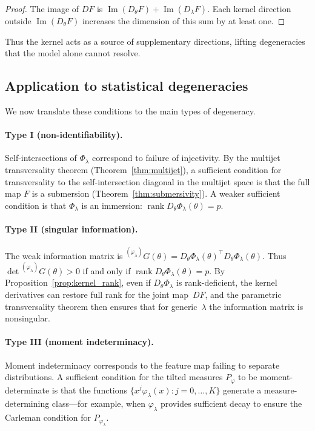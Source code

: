 \documentclass[11pt,a4paper]{article}
\begin{document}
\begin{proof}
The image of $DF$ is
$\operatorname{Im}(D_\theta F) + \operatorname{Im}(D_\lambda F)$.
Each kernel direction outside $\operatorname{Im}(D_\theta F)$
increases the dimension of this sum by at least one.
\end{proof}

Thus the kernel acts as a source of supplementary directions,
lifting degeneracies that the model alone cannot resolve.


\subsection{Application to statistical degeneracies}

We now translate these conditions to the main types of degeneracy.

\paragraph{Type I (non-identifiability).}
Self-intersections of $\Phi_\lambda$ correspond to failure of
injectivity.  By the multijet transversality theorem
(Theorem~\ref{thm:multijet}), a sufficient condition for
transversality to the self-intersection diagonal in the multijet
space is that the full map $F$ is a submersion
(Theorem~\ref{thm:submersivity}).  A weaker sufficient condition is
that $\Phi_\lambda$ is an immersion:
$\operatorname{rank} D_\theta\Phi_\lambda(\theta) = p$.

\paragraph{Type II (singular information).}
The weak information matrix is
${}^{(\varphi_\lambda)}G(\theta) =
D_\theta\Phi_\lambda(\theta)^\top D_\theta\Phi_\lambda(\theta)$.
Thus $\det {}^{(\varphi_\lambda)}G(\theta) > 0$ if and only if
$\operatorname{rank} D_\theta\Phi_\lambda(\theta) = p$.  By
Proposition~\ref{prop:kernel_rank}, even if
$D_\theta\Phi_\lambda$ is rank-deficient, the kernel derivatives can
restore full rank for the joint map~$DF$, and the parametric
transversality theorem then ensures that for generic~$\lambda$ the
information matrix is nonsingular.

\paragraph{Type III (moment indeterminacy).}
Moment indeterminacy corresponds to the feature map failing to
separate distributions.  A sufficient condition for the tilted
measures $P_\varphi$ to be moment-determinate is that the functions
$\{x^j\varphi_\lambda(x) : j = 0,\ldots,K\}$ generate a
measure-determining class---for example, when $\varphi_\lambda$
provides sufficient decay to ensure the Carleman condition for
$P_{\varphi_\lambda}$.
\end{document}
